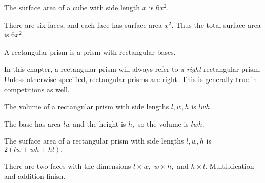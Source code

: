 \begin{theo}
The surface area of a cube with side length $x$ is $6x^2.$
\end{theo}

\begin{pro}
There are six faces, and each face has surface area $x^2.$ Thus the total surface area is $6x^2.$
\end{pro}

\begin{defi}
A rectangular prism is a prism with rectangular bases.
\begin{center}
\end{center}
\end{defi}

In this chapter, a rectangular prism will always refer to a \textit{right} rectangular prism. Unless otherwise specified, rectangular prisms are right. This is generally true in competitions as well.

\begin{theo}
The volume of a rectangular prism with side lengths $l,w,h$ is $lwh.$
\end{theo}

\begin{pro}
The base has area $lw$ and the height is $h,$ so the volume is $lwh.$
\end{pro}

\begin{theo}
The surface area of a rectangular prism with side lengths $l,w,h$ is $2(lw+wh+hl).$
\end{theo}

\begin{pro}
There are two faces with the dimensions $l\times w,$ $w\times h,$ and $h\times l.$ Multiplication and addition finish.
\end{pro}

